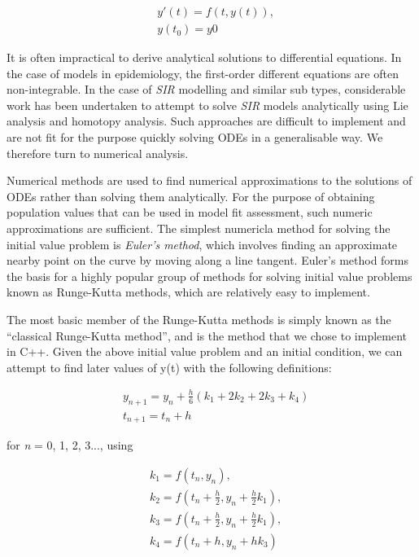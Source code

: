 \documentclass[11pt, a4paper, oneside,titlepage]{article}
\begin{document}
\begin{framed}
\begin{equation}
\begin{split}
  &y'(t) = f(t,y(t)),\\
  &y(t_0) = y0
 \end{split}
 \end{equation}

It is often impractical to derive analytical solutions to
differential equations. In the case of models in epidemiology, the
first-order different equations are often
non-integrable.\cite{shabbir} In the case of \emph{SIR} modelling and similar sub
types, considerable work has been undertaken to attempt to solve
\emph{SIR} models analytically using Lie analysis and homotopy
analysis.\cite{nucci, khan} Such approaches are difficult to implement
and are not fit for the purpose quickly solving ODEs in a
generalisable way. We therefore turn to numerical
analysis.

Numerical methods are used to find numerical approximations to the
solutions of ODEs rather than solving them analytically. For the
purpose of obtaining population values that can be used in model fit
assessment, such numeric approximations are sufficient. The simplest
numericla method for solving the initial value problem is \emph
{Euler's method}, which involves finding an approximate nearby point
on the curve by moving along a line tangent. Euler's method forms
the basis for a highly popular group of
methods for solving initial value problems known as Runge-Kutta
methods, which are relatively easy to implement. 

The most basic member of the Runge-Kutta methods is simply known as
the ``classical Runge-Kutta method'', and is the method that we chose
to implement in C++. Given the above initial value problem and an
initial condition, we can attempt to find later values of y(t) with
the following definitions:

\begin{equation}
\begin{split}
  &y_{n+1} = y_n + \frac{h}{6}(k_1 + 2k_2 + 2k_3 + k_4)\\
  &t_{n+1} = t_n + h
 \end{split}
\end{equation}

for \emph{n} = 0, 1, 2, 3..., using

\begin{equation}
\begin{split}
  &k_1 = f(t_n,y_n),\\
  &k_2 = f(t_n + \frac{h}{2},y_n+ \frac{h}{2}k_1),\\
  &k_3 = f(t_n + \frac{h}{2},y_n+ \frac{h}{2}k_1),\\
  &k_4 = f(t_n+h,y_n+hk_3)
\end{split}
\end{equation}


\end{framed}
\end{document}
